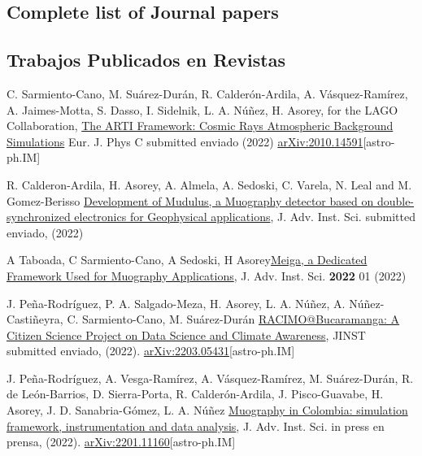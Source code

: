 \ifeng
\subsection*{Complete list of Journal papers}
\else
\subsection*{Trabajos Publicados en Revistas}
\fi
\noindent
\begin{etaremune}

\item {} C. Sarmiento-Cano, M. Suárez-Durán, R. Calderón-Ardila, A. Vásquez-Ramírez, A. Jaimes-Motta, S. Dasso, I. Sidelnik, L. A. Núñez, H. Asorey, for the LAGO Collaboration, \href{}{The ARTI Framework: Cosmic Rays Atmospheric Background Simulations} Eur. J. Phys C \ifeng submitted \else enviado \fi (2022) \href{https://arxiv.org/abs/2010.14591}{arXiv:2010.14591}[astro-ph.IM]

\item {} R. Calderon-Ardila, H. Asorey, A. Almela, A. Sedoski, C. Varela, N. Leal and M. Gomez-Berisso \href{}{Development of Mudulus, a Muography detector based on
double-synchronized electronics for Geophysical applications}, J. Adv. Inst. Sci. \ifeng submitted \else enviado\fi, (2022)

\item {} A Taboada, C Sarmiento-Cano, A Sedoski, H Asorey\href{https://doi.org/10.31526/jais.2022.266}{Meiga, a Dedicated Framework Used for Muography Applications},  J. Adv. Inst. Sci. {\bf{2022}} 01 (2022) %

\item {} J. Peña-Rodríguez, P. A. Salgado-Meza, H. Asorey, L. A. Núñez, A. Núñez-Castiñeyra, C. Sarmiento-Cano, M. Suárez-Durán \href{}{RACIMO@Bucaramanga: A Citizen Science Project on Data Science and Climate Awareness}, JINST \ifeng submitted \else enviado\fi, (2022). \href{http://arxiv.org/abs/2203.05431}{arXiv:2203.05431}[astro-ph.IM]

\item {} J. Peña-Rodríguez, A. Vesga-Ramírez, A. Vásquez-Ramírez, M. Suárez-Durán, R. de León-Barrios, D. Sierra-Porta, R. Calderón-Ardila, J. Pisco-Guavabe, H. Asorey, J. D. Sanabria-Gómez, L. A. Núñez \href{}{Muography in Colombia: simulation framework, instrumentation and data analysis}, J. Adv. Inst. Sci. \ifeng in press \else en prensa\fi, (2022). \href{ http://arxiv.org/abs/2201.11160}{arXiv:2201.11160}[astro-ph.IM]


\end{etaremune}

